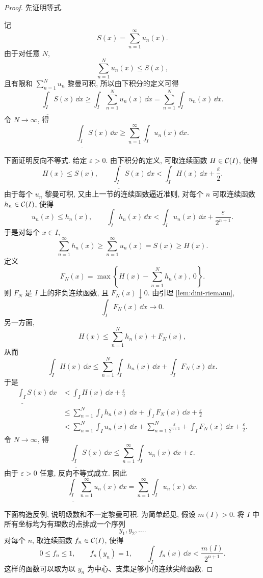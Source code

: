 \begin{proof}
	先证明等式.
	
	记
	\[
	S(x)=\sum_{n=1}^{\infty}u_n(x).
	\]
	由于对任意 \(N\),
	\[
	\sum_{n=1}^{N}u_n(x)\leq S(x),
	\]
	且有限和 \(\sum_{n=1}^{N}u_n\) 黎曼可积, 所以由下积分的定义可得
	\[
	\underline{\int_I}S(x)\,\dd x
	\geq
	\int_I \sum_{n=1}^{N}u_n(x)\,\dd x
	=
	\sum_{n=1}^{N}\int_I u_n(x)\,\dd x.
	\]
	令 \(N\to\infty\), 得
	\[
	\underline{\int_I}S(x)\,\dd x
	\geq
	\sum_{n=1}^{\infty}\int_I u_n(x)\,\dd x.
	\]
	
	下面证明反向不等式. 给定 \(\varepsilon>0\). 由下积分的定义, 可取连续函数
	\(H\in\mathcal{C}(I)\), 使得
	\[
	H(x)\leq S(x),
	\qquad
	\underline{\int_I}S(x)\,\dd x
	<
	\int_I H(x)\,\dd x+\frac{\varepsilon}{2}.
	\]
	由于每个 \(u_n\) 黎曼可积, 又由上一节的连续函数逼近准则, 对每个 \(n\) 可取连续函数 \(h_n\in\mathcal{C}(I)\), 使得
	\[
	u_n(x)\leq h_n(x),
	\qquad
	\int_I h_n(x)\,\dd x
	<
	\int_I u_n(x)\,\dd x+\frac{\varepsilon}{2^{n+1}}.
	\]
	于是对每个 \(x\in I\),
	\[
	\sum_{n=1}^{\infty}h_n(x)\geq \sum_{n=1}^{\infty}u_n(x)=S(x)\geq H(x).
	\]
	定义
	\[
	F_N(x)
	=
	\max\left\{
	H(x)-\sum_{n=1}^{N}h_n(x),\,0
	\right\}.
	\]
	则 \(F_N\) 是 \(I\) 上的非负连续函数, 且 \(F_N(x)\downarrow 0\). 由引理
	\ref{lem:dini-riemann},
	\[
	\int_I F_N(x)\,\dd x\longrightarrow 0.
	\]
	另一方面,
	\[
	H(x)\leq \sum_{n=1}^{N}h_n(x)+F_N(x),
	\]
	从而
	\[
	\int_I H(x)\,\dd x
	\leq
	\sum_{n=1}^{N}\int_I h_n(x)\,\dd x
	+
	\int_I F_N(x)\,\dd x.
	\]
	于是
	\begin{align*}
		\underline{\int_I}S(x)\,\dd x
		&<
		\int_I H(x)\,\dd x+\frac{\varepsilon}{2}\\
		&\leq
		\sum_{n=1}^{N}\int_I h_n(x)\,\dd x
		+
		\int_I F_N(x)\,\dd x
		+\frac{\varepsilon}{2}\\
		&<
		\sum_{n=1}^{N}\int_I u_n(x)\,\dd x
		+
		\sum_{n=1}^{N}\frac{\varepsilon}{2^{n+1}}
		+
		\int_I F_N(x)\,\dd x
		+\frac{\varepsilon}{2}.
	\end{align*}
	令 \(N\to\infty\), 得
	\[
	\underline{\int_I}S(x)\,\dd x
	\leq
	\sum_{n=1}^{\infty}\int_I u_n(x)\,\dd x+\varepsilon.
	\]
	由于 \(\varepsilon>0\) 任意, 反向不等式成立. 因此
	\[
	\underline{\int_I}\sum_{n=1}^{\infty}u_n(x)\,\dd x
	=
	\sum_{n=1}^{\infty}\int_I u_n(x)\,\dd x.
	\]
	
	下面构造反例, 说明级数和不一定黎曼可积. 为简单起见, 假设 \(m(I)>0\). 将 \(I\) 中所有坐标均为有理数的点排成一个序列
	\[
	y_1,y_2,\ldots.
	\]
	对每个 \(n\), 取连续函数 \(f_n\in\mathcal{C}(I)\), 使得
	\[
	0\leq f_n\leq 1,
	\qquad
	f_n(y_n)=1,
	\qquad
	\int_I f_n(x)\,\dd x<\frac{m(I)}{2^{n+1}}.
	\]
	这样的函数可以取为以 \(y_n\) 为中心、支集足够小的连续尖峰函数.
	

\end{proof}
